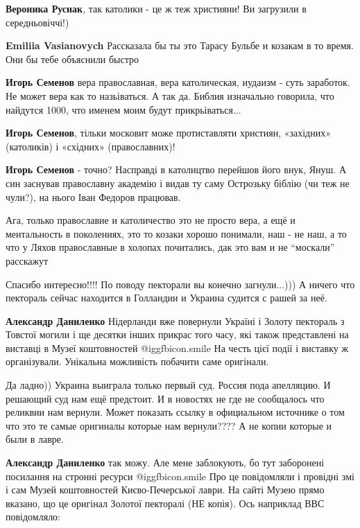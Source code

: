 \begin{itemize}
\begin{itemize}
\textbf{Вероника Руснак}, так католики - це ж теж християни! Ви загрузили в середньовіччі!)

\textbf{Emiliia Vasianovych} Рассказала бы ты это Тарасу Бульбе и козакам в то время. Они бы тебе объяснили быстро

\textbf{Игорь Семенов} вера православная, вера католическая, иудаизм - суть заработок. Не может вера как то назьіваться. А так да. Библия изначально говорила, что найдутся 1000, что именем моим будут прикрьіваться...

\textbf{Игорь Семенов}, тільки московит може протиставляти християн, «західних» (католиків) і «східних» (православних)!

\textbf{Игорь Семенов} - точно? Насправді в католицтво перейшов його внук, Януш. А син заснував православну академію і видав ту саму Острозьку біблію (чи теж не чули?), на нього Іван Федоров працював.


Ага, только православие и католичество это не просто вера, а ещё и ментальность
в поколениях, это то козаки хорошо понимали, наш - не наш, а то что у Ляхов
православные в холопах почитались, дак это вам и не \enquote{москали} расскажут

\end{itemize} %

Спасибо интересно!!!!
По поводу пекторали вы конечно загнули...)))
А ничего что пектораль сейчас находится в Голландии и Украина судится с рашей за неё.

\begin{itemize} %
\textbf{Александр Даниленко} Нідерланди вже повернули Україні і Золоту пектораль з Товстої могили і ще десятки інших прикрас того часу, які також представлені на виставці в Музеї коштовностей  @igg{fbicon.smile} 
На честь цієї події і виставку ж організували. Унікальна можливість побачити саме оригінали.

Да ладно))
Украина выиграла только первый суд. Россия пода апелляцию.
И решающий суд нам ещё предстоит.
И в новостях не где не сообщалось что реликвии нам вернули.
Может показать ссылку в официальном источнике о том что это те самые оригиналы которые нам вернули????
А не копии которые и были в лавре.

\begin{itemize} %
\textbf{Александр Даниленко} так можу. Але мене заблокують, бо тут заборонені посилання на стронні ресурси  @igg{fbicon.smile} 
Про це повідомляли і провідні змі і сам Музей коштовностей Києво-Печерської лаври. На сайті Музею прямо вказано, що це оригінал Золотої пекторалі (НЕ копія).
Ось наприклад ВВС повідомляло:


\end{itemize}
\end{itemize}
\end{itemize}
